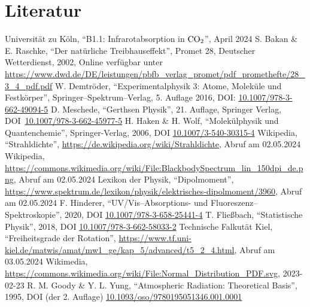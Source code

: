 \documentclass[12pt,a4paper]{scrartcl}
\numberwithin{equation}{section} %
\begin{document}
\clearpage
\hypertarget{literatur}{%
\section{Literatur}\label{literatur}}
\renewcommand{\section}[2]{} %
\begin{thebibliography}{9}
	Universität zu Köln, ``B1.1: Infrarotabsorption in $\ce{CO_2}$'', April 2024
	S. Bakan \& E. Raschke, ``Der natürliche Treibhauseffekt'', Promet 28,
	Deutscher Wetterdienst, 2002, Online verfügbar unter
	\url{https://www.dwd.de/DE/leistungen/pbfb_verlag_promet/pdf_promethefte/28_3_4_pdf.pdf}
	W. Demtröder, ``Experimentalphysik 3: Atome, Moleküle und Festkörper'',
	Springer--Spektrum--Verlag, 5. Auflage 2016, DOI:
	\href{https://doi.org/10.1007/978-3-662-49094-5}{10.1007/978-3-662-49094-5}
	D. Meschede, ``Gerthsen Physik'', 21. Auflage, Springer Verlag,
	DOI~\href{https://doi.org/10.1007/978-3-662-45977-5}{10.1007/978-3-662-45977-5}
	H. Haken \& H. Wolf, ``Molekülphysik und Quantenchemie'', Springer-Verlag, 2006, DOI \href{https://doi.org/10.1007/3-540-30315-4}{10.1007/3-540-30315-4}
	Wikipedia, ``Strahldichte'',
	\url{https://de.wikipedia.org/wiki/Strahldichte}, Abruf am 02.05.2024
	Wikipedia, \url{https://commons.wikimedia.org/wiki/File:BlackbodySpectrum_lin_150dpi_de.png},
	Abruf am 02.05.2024
	Lexikon der Physik, ``Dipolmoment'',
	\url{https://www.spektrum.de/lexikon/physik/elektrisches-dipolmoment/3960},
	Abruf am 02.05.2024
	F. Hinderer, ``UV/Vis--Absorptions- und Fluoreszenz--Spektroskopie'',
	2020, DOI \href{https://doi.org/10.1007/978-3-658-25441-4}{10.1007/978-3-658-25441-4}
	T. Fließbach, ``Statistische Physik'', 2018, DOI
	\href{https://doi.org/10.1007/978-3-662-58033-2}{10.1007/978-3-662-58033-2}
	Technische Falkutät Kiel, ``Freiheitsgrade der Rotation'',
	\url{https://www.tf.uni-kiel.de/matwis/amat/mw1_ge/kap_5/advanced/t5_2_4.html},
	Abruf am 03.05.2024
	Wikimedia,
	\url{https://commons.wikimedia.org/wiki/File:Normal_Distribution_PDF.svg},
	2023-02-23
	R. M. Goody \& Y. L. Yung, ``Atmospheric Radiation: Theoretical Basis'', 1995,
	DOI  (der 2. Auflage) \href{https://doi.org/10.1093/oso/9780195051346.001.0001}{10.1093/oso/9780195051346.001.0001}

\end{thebibliography}
\end{document}
